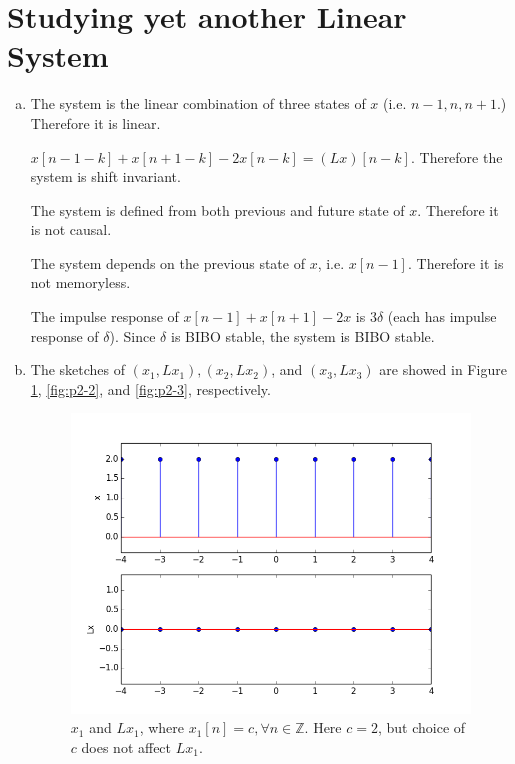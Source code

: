 \section{Studying yet another Linear System}\label{sec:p2}

\begin{enumerate}[(a)]
\item 
The system is the linear combination of three states of $x$ (i.e. $n-1, n, n+1$.) Therefore it is linear.

$x[n-1-k]+x[n+1-k]-2x[n-k] = (Lx)[n-k]$. Therefore the system is shift invariant.

The system is defined from both previous and future state of $x$. Therefore it is not causal.

The system depends on the previous state of $x$, i.e. $x[n-1]$. Therefore it is not memoryless.

The impulse response of $x[n-1] + x[n+1] - 2x$ is $3\delta$ (each has impulse response of $\delta$). Since $\delta$ is BIBO stable, the system is BIBO stable.

\item The sketches of $(x_1, Lx_1), (x_2, Lx_2)$, and $(x_3, Lx_3)$ are showed in Figure \ref{fig:p2-1}, \ref{fig:p2-2}, and \ref{fig:p2-3}, respectively.

\begin{figure}[htbp]
	\centering
	\includegraphics[width=\textwidth,trim={0.2in 0.2in 0.2in 0.2in},clip]{images/p2-1}
	\caption{$x_1$ and $Lx_1$, where  $x_1[n] = c, \forall n \in \mathbb{Z}$. Here $c=2$, but choice of $c$ does not affect $Lx_1$.}
	\label{fig:p2-1}
\end{figure}


\end{enumerate}
